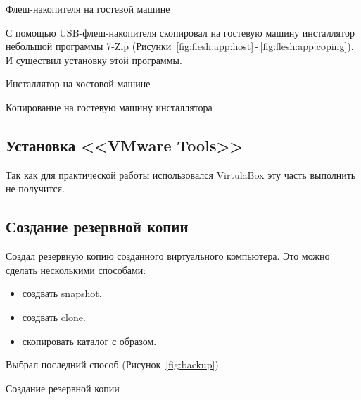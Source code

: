 \begin{image}
	\caption{Флеш-накопителя на гостевой машине}
	\label{fig:flesh:guest}
\end{image}

С помощью USB-флеш-накопителя скопировал на гостевую машину инсталлятор
небольшой программы 7-Zip
(Рисунки~\ref{fig:flesh:app:host}\,-\,\ref{fig:flesh:app:coping}).
И существил установку этой программы.

\begin{image}
	\caption{Инсталлятор на хостовой машине}
	\label{fig:flesh:app:host}
\end{image}

\begin{image}
	\caption{Копирование на гостевую машину инсталлятора}
	\label{fig:flesh:app:coping}
\end{image}

\clearpage

\subsection{Установка <<VMware Tools>>}

Так как для практической работы использовался VirtulaBox
эту часть выполнить не получится.

\subsection{Создание резервной копии}

Создал резервную копию созданного виртуального компьютера.
Это можно сделать несколькими способами:

\begin{itemize}
	\item создвать snapshot.
	\item создвать clone.
	\item скопировать каталог с образом.
\end{itemize}

Выбрал последний способ (Рисунок~\ref{fig:backup}).

\begin{image}
	\caption{Создание резервной копии}
	\label{fig:backup}
\end{image}

\clearpage

